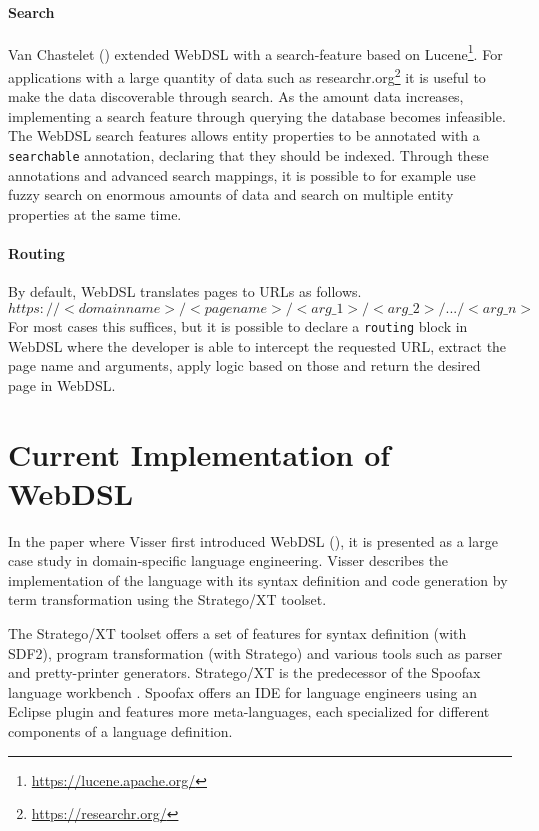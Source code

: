     \paragraph{Search} Van Chastelet (\citeyear{VanChastelet2013}) extended WebDSL with a search-feature based on Lucene\footnote{\url{https://lucene.apache.org/}}. For applications with a large quantity of data such as researchr.org\footnote{\url{https://researchr.org/}} it is useful to make the data discoverable through search. As the amount data increases, implementing a search feature through querying the database becomes infeasible. The WebDSL search features allows entity properties to be annotated with a \texttt{searchable} annotation, declaring that they should be indexed. Through these annotations and advanced search mappings, it is possible to for example use fuzzy search on enormous amounts of data and search on multiple entity properties at the same time.

    \paragraph{Routing} By default, WebDSL translates pages to URLs as follows.
    $$
    https://<domainname>/<pagename>/<arg\_1>/<arg\_2>/.../<arg\_n> 
    $$
    For most cases this suffices, but it is possible to declare a \texttt{routing} block in WebDSL where the developer is able to intercept the requested URL, extract the page name and arguments, apply logic based on those and return the desired page in WebDSL.

  \section{\label{sec:current-implementation}Current Implementation of WebDSL}

    In the paper where Visser first introduced WebDSL (\citeyear{Visser2007}), it is presented as a large case study in domain-specific language engineering. Visser describes the implementation of the language with its syntax definition and code generation by term transformation using the Stratego/XT toolset.

    The Stratego/XT toolset \autocite{BravenboerKVV08} offers a set of features for syntax definition (with SDF2), program transformation (with Stratego)  and various tools such as parser and pretty-printer generators. Stratego/XT is the predecessor of the Spoofax language workbench \autocite{KatsV10}. Spoofax offers an IDE for language engineers using an Eclipse plugin and features more meta-languages, each specialized for different components of a language definition.
    
